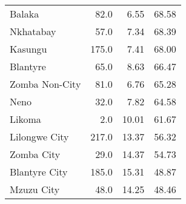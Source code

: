 \begin{tabular}{lrrr}
Balaka         &    82.0 &           6.55 &               68.58 \\
Nkhatabay      &    57.0 &           7.34 &               68.39 \\
Kasungu        &   175.0 &           7.41 &               68.00 \\
Blantyre       &    65.0 &           8.63 &               66.47 \\
Zomba Non-City &    81.0 &           6.76 &               65.28 \\
Neno           &    32.0 &           7.82 &               64.58 \\
Likoma         &     2.0 &          10.01 &               61.67 \\
Lilongwe City  &   217.0 &          13.37 &               56.32 \\
Zomba City     &    29.0 &          14.37 &               54.73 \\
Blantyre City  &   185.0 &          15.31 &               48.87 \\
Mzuzu City     &    48.0 &          14.25 &               48.46 \\
\bottomrule
\end{tabular}
